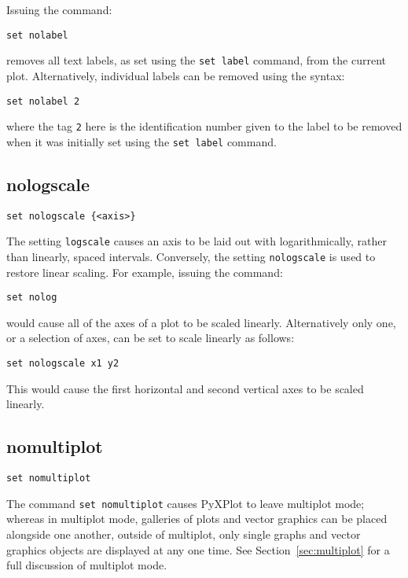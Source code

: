 Issuing the command:

\begin{verbatim}
set nolabel
\end{verbatim}

\noindent removes all text labels, as set using the {\tt set label} command,
from the current plot. Alternatively, individual labels can be removed using
the syntax:

\begin{verbatim}
set nolabel 2
\end{verbatim}

\noindent where the tag {\tt 2} here is the identification number given to
the label to be removed when it was initially set using the {\tt set label}
command.


\subsection{nologscale}

\begin{verbatim}
set nologscale {<axis>}
\end{verbatim}

The setting {\tt logscale} causes an axis to be laid out with logarithmically,
rather than linearly, spaced intervals. Conversely, the setting {\tt nologscale}
is used to restore linear scaling. For example, issuing the command:

\begin{verbatim}
set nolog
\end{verbatim}

\noindent would cause all of the axes of a plot to be scaled linearly. Alternatively only one,
or a selection of axes, can be set to scale linearly as follows:

\begin{verbatim}
set nologscale x1 y2
\end{verbatim}

This would cause the first horizontal and second vertical axes to be scaled linearly.


\subsection{nomultiplot}

\begin{verbatim}
set nomultiplot
\end{verbatim}

The command {\tt set nomultiplot} causes PyXPlot to leave multiplot mode;
whereas in multiplot mode, galleries of plots and vector graphics can be placed
alongside one another, outside of multiplot, only single graphs and vector
graphics objects are displayed at any one time.  See
Section~\ref{sec:multiplot} for a full discussion of multiplot mode.


